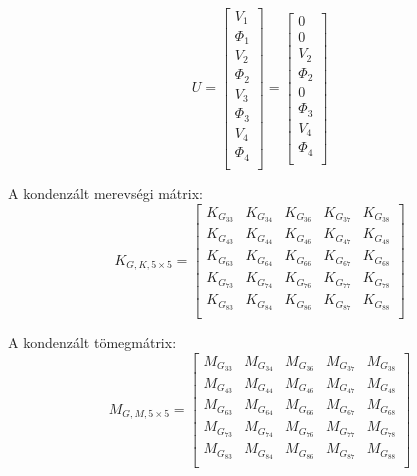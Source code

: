 \documentclass{article}
\begin{document}
			\begin{equation}
				U=
				\begin{bmatrix}
				V_{1}    \\
				\Phi_{1} \\
				V_{2}    \\
				\Phi_{2} \\
				V_{3}    \\
				\Phi_{3} \\
				V_{4}    \\
				\Phi_{4} \\
				\end{bmatrix}
				=
				\begin{bmatrix}
				0  \\
				0 \\
				V_{2}    \\
				\Phi_{2} \\
				0   \\
				\Phi_{3} \\
				V_{4}    \\
				\Phi_{4} \\
				\end{bmatrix}
			\end{equation}
			
			A kondenzált merevségi mátrix: 
			\begin{equation}
				K_{G,K,5\times5}=
				\begin{bmatrix}
				K_{G_{33}}	 & K_{G_{34}}	 & K_{G_{36}} & K_{G_{37}}	 & K_{G_{38}}  \\
				K_{G_{43}}	 & K_{G_{44}}	 & K_{G_{46}} & K_{G_{47}}	 & K_{G_{48}}  \\
				K_{G_{63}}	 & K_{G_{64}}	 & K_{G_{66}} & K_{G_{67}}	 & K_{G_{68}}  \\
				K_{G_{73}}	 & K_{G_{74}}	 & K_{G_{76}} & K_{G_{77}}	 & K_{G_{78}}  \\
				K_{G_{83}}	 & K_{G_{84}}	 & K_{G_{86}} & K_{G_{87}}	 & K_{G_{88}}  \\
				\end{bmatrix}
			\end{equation}
			
			A kondenzált tömegmátrix: 
			\begin{equation}
				M_{G,M,5\times5}=
				\begin{bmatrix}
				M_{G_{33}}	 & M_{G_{34}}	 & M_{G_{36}} & M_{G_{37}}	 & M_{G_{38}}  \\
				M_{G_{43}}	 & M_{G_{44}}	 & M_{G_{46}} & M_{G_{47}}	 & M_{G_{48}}  \\
				M_{G_{63}}	 & M_{G_{64}}	 & M_{G_{66}} & M_{G_{67}}	 & M_{G_{68}}  \\
				M_{G_{73}}	 & M_{G_{74}}	 & M_{G_{76}} & M_{G_{77}}	 & M_{G_{78}}  \\
				M_{G_{83}}	 & M_{G_{84}}	 & M_{G_{86}} & M_{G_{87}}	 & M_{G_{88}}  \\
				\end{bmatrix}
			\end{equation}
			
\end{document}
